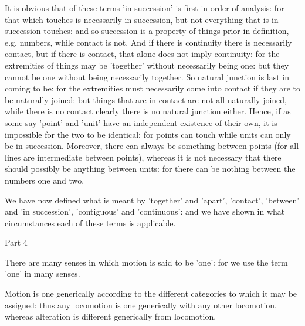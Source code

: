 It is obvious that of these terms 'in succession' is first in order
of analysis: for that which touches is necessarily in succession,
but not everything that is in succession touches: and so succession
is a property of things prior in definition, e.g. numbers, while contact
is not. And if there is continuity there is necessarily contact, but
if there is contact, that alone does not imply continuity: for the
extremities of things may be 'together' without necessarily being
one: but they cannot be one without being necessarily together. So
natural junction is last in coming to be: for the extremities must
necessarily come into contact if they are to be naturally joined:
but things that are in contact are not all naturally joined, while
there is no contact clearly there is no natural junction either. Hence,
if as some say 'point' and 'unit' have an independent existence of
their own, it is impossible for the two to be identical: for points
can touch while units can only be in succession. Moreover, there can
always be something between points (for all lines are intermediate
between points), whereas it is not necessary that there should possibly
be anything between units: for there can be nothing between the numbers
one and two. 

We have now defined what is meant by 'together' and 'apart', 'contact',
'between' and 'in succession', 'contiguous' and 'continuous': and
we have shown in what circumstances each of these terms is applicable.

Part 4

There are many senses in which motion is said to be 'one': for we
use the term 'one' in many senses. 

Motion is one generically according to the different categories to
which it may be assigned: thus any locomotion is one generically with
any other locomotion, whereas alteration is different generically
from locomotion. 

